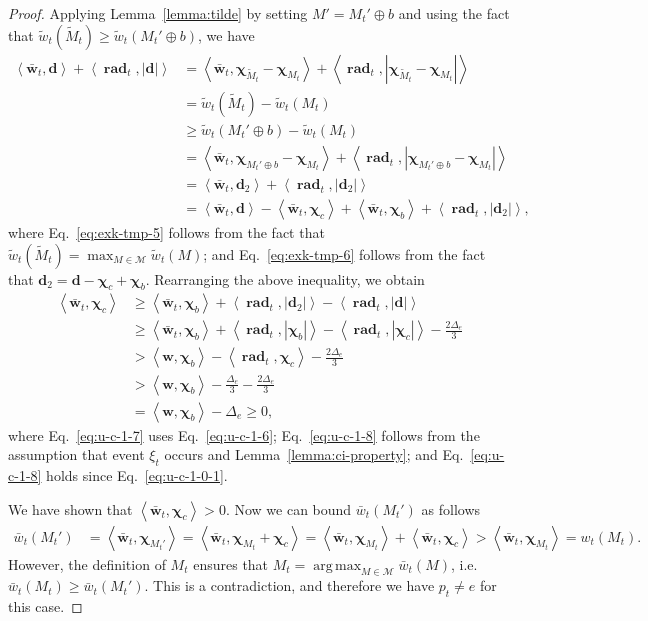 \documentclass{article}
\newcommand{\M}{\mathcal M}
\DeclareMathOperator{\rad}{rad}
\DeclareMathOperator*{\argmax}{arg\,max}
\newcommand{\inn}[1]{\left\langle #1 \right\rangle}
\renewcommand{\vec}[1]{\boldsymbol{#1}}
\begin{document}
\begin{proof}
Applying Lemma~\ref{lemma:tilde} by setting $M' = M_t' \oplus b$ and using the fact that $\tilde w_t(\tilde M_t) \ge \tilde w_t(M_t' \oplus b)$, we have 
\begin{align}
\inn{\vec {\bar w}_t, \vec d}+\inn{\vec \rad_t, |\vec d|}
& = \inn{\vec {\bar w}_t, \vec \chi_{\tilde M_t}-\vec\chi_{M_t}}+\inn{\vec \rad_t, |\vec \chi_{\tilde M_t}-\vec\chi_{M_t}|}\nonumber\\
& = \tilde w_t(\tilde M_t)- \tilde w_t(M_t)\nonumber\\
& \ge \tilde w_t(M_t'\oplus b) - \tilde w_t(M_t)\label{eq:exk-tmp-5}\\
&= \inn{\vec {\bar w}_t, \vec \chi_{M_t' \oplus b}-\vec\chi_{M_t}}+\inn{\vec \rad_t, |\vec \chi_{M_t' \oplus b}-\vec\chi_{M_t}|}\nonumber\\
&= \inn{\vec {\bar w}_t, \vec d_2}+\inn{\vec \rad_t, |\vec d_2|}\nonumber \\
&= \inn{\vec {\bar w}_t, \vec d}-\inn{\vec {\bar w}_t, \vec \chi_c}+\inn{\vec {\bar w}_t,\vec\chi_b}+\inn{\vec \rad_t, |\vec d_2|},\label{eq:exk-tmp-6}
\end{align}
where Eq.~\eqref{eq:exk-tmp-5} follows from the fact that $\tilde w_t(\tilde M_t) = \max_{M\in \M} \tilde w_t(M)$;
and Eq.~\eqref{eq:exk-tmp-6} follows from the fact that $\vec d_2 = \vec d-\vec \chi_{c}+\vec \chi_{b}$.
Rearranging the above inequality, we obtain
\begin{align}
\inn{\vec {\bar w}_t, \vec \chi_c} &\ge \inn{\vec {\bar w}_t, \vec \chi_b}+\inn{\vec \rad_t, |\vec d_2|}-\inn{\vec \rad_t, |\vec d|}\nonumber \\
&\ge  \inn{\vec {\bar w}_t, \vec \chi_b}+
\left\langle \vec \rad_t, |\vec\chi_b| \right\rangle
  -\left\langle \vec \rad_t, |\vec\chi_c| \right\rangle
  -\frac{2\Delta_e}{3} \label{eq:u-c-1-7}\\
&> \inn{\vec w, \vec \chi_b}-\inn{\vec \rad_t, \vec \chi_c}-\frac{2\Delta_e}{3} \label{eq:u-c-1-8}\\
&> \inn{\vec w, \vec \chi_b}-\frac{\Delta_e}{3}-\frac{2\Delta_e}{3} \label{eq:u-c-1-9}\\
&= \inn{\vec w, \vec \chi_b}-\Delta_e \ge 0,
\end{align}
where Eq.~\eqref{eq:u-c-1-7} uses Eq.~\eqref{eq:u-c-1-6}; 
Eq.~\eqref{eq:u-c-1-8} follows from the assumption that event $\xi_t$ occurs and Lemma~\ref{lemma:ci-property};
and Eq.~\eqref{eq:u-c-1-8} holds since Eq.~\eqref{eq:u-c-1-0-1}.

We have shown that $\inn{\vec {\bar w}_t,\vec \chi_c}>0$. Now we can bound $\bar w_t(M_t')$ as follows
\begin{align*}
 \bar w_t(M_t') &= \inn{\vec {\bar w}_t, \vec \chi_{M_t'}} = \inn{\vec {\bar w}_t, \vec \chi_{M_t}+\vec \chi_c} =
 \inn{\vec {\bar w}_t, \vec \chi_{M_t}}+\inn{\vec {\bar w}_t, \vec \chi_c} > \inn{\vec {\bar w}_t, \vec \chi_{M_t}} = w_t(M_t).
\end{align*}
However, the definition of $M_t$ ensures that $M_t = \argmax_{M\in\M} \bar w_t(M)$, i.e. $\bar w_t(M_t) \ge \bar w_t(M_t')$. 
This is a contradiction, and therefore we have $p_t \not=e$ for this case.


\end{proof}
\end{document}
